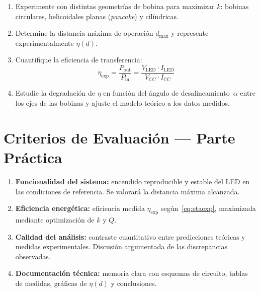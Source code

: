 \documentclass[11pt,a4paper]{article}
\begin{document}
\begin{enumerate}
  \item Experimente con distintas geometrías de bobina para maximizar $k$:
        bobinas circulares, helicoidales planas (\textit{pancake}) y cilíndricas.
  \item Determine la distancia máxima de operación $d_{\max}$ y represente
        experimentalmente $\eta(d)$.
  \item Cuantifique la eficiencia de transferencia:
        \begin{equation}
          \eta_{\text{exp}} = \frac{P_{\text{out}}}{P_{\text{in}}}
                            = \frac{V_{\text{LED}} \cdot I_{\text{LED}}}{V_{CC} \cdot I_{CC}}
          \label{eq:etaexp}
        \end{equation}
  \item Estudie la degradación de $\eta$ en función del ángulo de desalineamiento~$\alpha$
        entre los ejes de las bobinas y ajuste el modelo teórico a los datos medidos.
\end{enumerate}

\section{Criterios de Evaluación --- Parte Práctica}

\begin{criteriobox}[title={Rúbrica de evaluación práctica}, fonttitle=\small\bfseries\color{verdemed}]
\begin{enumerate}
  \item \textbf{Funcionalidad del sistema:} encendido reproducible y estable del LED en las condiciones
        de referencia. Se valorará la distancia máxima alcanzada.
  \item \textbf{Eficiencia energética:} eficiencia medida $\eta_{\text{exp}}$ según~\eqref{eq:etaexp},
        maximizada mediante optimización de $k$ y $Q$.
  \item \textbf{Calidad del análisis:} contraste cuantitativo entre predicciones teóricas y medidas
        experimentales. Discusión argumentada de las discrepancias observadas.
  \item \textbf{Documentación técnica:} memoria clara con esquemas de circuito, tablas de medidas,
        gráficas de $\eta(d)$ y conclusiones.
\end{enumerate}
\end{criteriobox}
\end{document}
